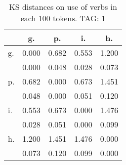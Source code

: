 \begin{table}[h!]
\begin{center}
\begin{tabular}{| l | c | c | c | c |}\hline
 & g. & p. & i. & h. \\\hline
g. & 0.000  & 0.682  & 0.553  & 1.200 \\\hline
 & 0.000  & 0.048  & 0.028  & 0.073 \\\hline
p. & 0.682  & 0.000  & 0.673  & 1.451 \\\hline
 & 0.048  & 0.000  & 0.051  & 0.120 \\\hline
i. & 0.553  & 0.673  & 0.000  & 1.476 \\\hline
 & 0.028  & 0.051  & 0.000  & 0.099 \\\hline
h. & 1.200  & 1.451  & 1.476  & 0.000 \\\hline
 & 0.073  & 0.120  & 0.099  & 0.000 \\\hline
\end{tabular}
\caption{KS distances on use of verbs in each 100 tokens. TAG: 1}
\end{center}
\end{table}